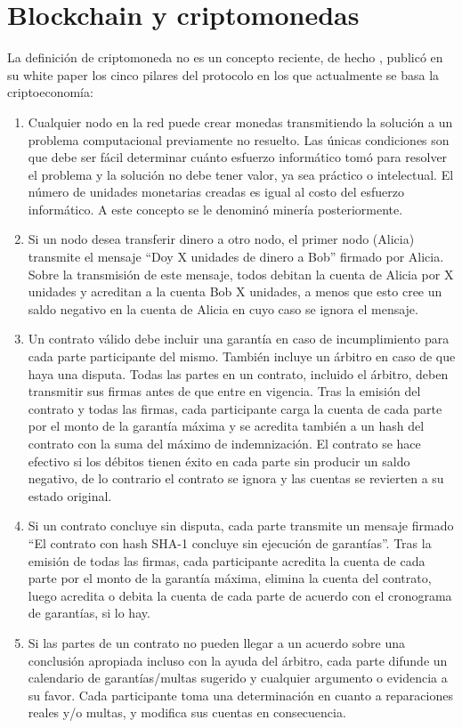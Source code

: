 \documentclass[../main/main.tex]{subfiles}
\begin{document}
  \section{Blockchain y criptomonedas}

  La definición de criptomoneda no es un concepto reciente, de hecho \cite{article:wei_dai_money}, publicó en su white paper los cinco pilares del protocolo en los que actualmente se basa la criptoeconomía:

  \begin{enumerate}
    \item Cualquier nodo en la red puede crear monedas transmitiendo la solución a un problema computacional previamente no resuelto. Las únicas condiciones son que debe ser fácil determinar cuánto esfuerzo informático tomó para resolver el problema y la solución no debe tener valor, ya sea práctico o intelectual. El número de unidades monetarias creadas es igual al costo del esfuerzo informático. A este concepto se le denominó minería posteriormente.
    \item Si un nodo desea transferir dinero a otro nodo, el primer nodo (Alicia) transmite el mensaje ``Doy X unidades de dinero a Bob'' firmado por Alicia. Sobre la transmisión de este mensaje, todos debitan la cuenta de Alicia por X unidades y acreditan a la cuenta Bob X unidades, a menos que esto cree un saldo negativo en la cuenta de Alicia en cuyo caso se ignora el mensaje.
    \item Un contrato válido debe incluir una garantía en caso de incumplimiento para cada parte participante del mismo. También incluye un árbitro en caso de que haya una disputa. Todas las partes en un contrato, incluido el árbitro, deben transmitir sus firmas antes de que entre en vigencia. Tras la emisión del contrato y todas las firmas, cada participante carga la cuenta de cada parte por el monto de la garantía máxima y se acredita también a un hash del contrato con la suma del máximo de indemnización. El contrato se hace efectivo si los débitos tienen éxito en cada parte sin producir un saldo negativo, de lo contrario el contrato se ignora y las cuentas se revierten a su estado original.
    \item Si un contrato concluye sin disputa, cada parte transmite un mensaje firmado ``El contrato con hash SHA-1 concluye sin ejecución de garantías''. Tras la emisión de todas las firmas, cada participante acredita la cuenta de cada parte por el monto de la garantía máxima, elimina la cuenta del contrato, luego acredita o debita la cuenta de cada parte de acuerdo con el cronograma de garantías, si lo hay.
    \item Si las partes de un contrato no pueden llegar a un acuerdo sobre una conclusión apropiada incluso con la ayuda del árbitro, cada parte difunde un calendario de garantías/multas sugerido y cualquier argumento o evidencia a su favor. Cada participante toma una determinación en cuanto a reparaciones reales y/o multas, y modifica sus cuentas en consecuencia.
  \end{enumerate}
\end{document}
